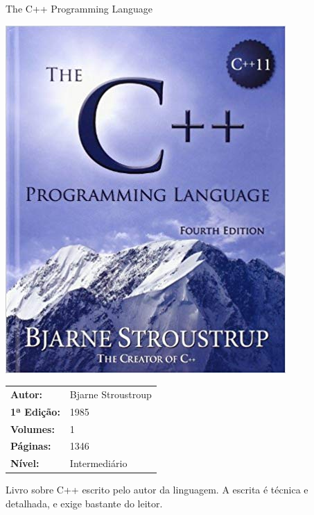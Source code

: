 \begin{frame}[fragile]{The C++ Programming Language}

    \begin{minipage}{0.4\textwidth}
        \includegraphics[scale=0.25]{bjarne.jpg}
    \end{minipage}
    \begin{minipage}{0.5\textwidth}
        \begin{small}
            \begin{tabularx}{0.95\textwidth}{lX}
                \textbf{Autor:} & Bjarne Stroustroup \\
                \textbf{1ª Edição:} & 1985 \\
                \textbf{Volumes:} & 1 \\
                \textbf{Páginas:} & 1346 \\
                \textbf{Nível:} & Intermediário \\
            \end{tabularx}
        \end{small}
    \end{minipage}

    \vspace{0.2in} 

    Livro sobre C++ escrito pelo autor da linguagem. A escrita é técnica e detalhada,
    e exige bastante do leitor.

\end{frame}

